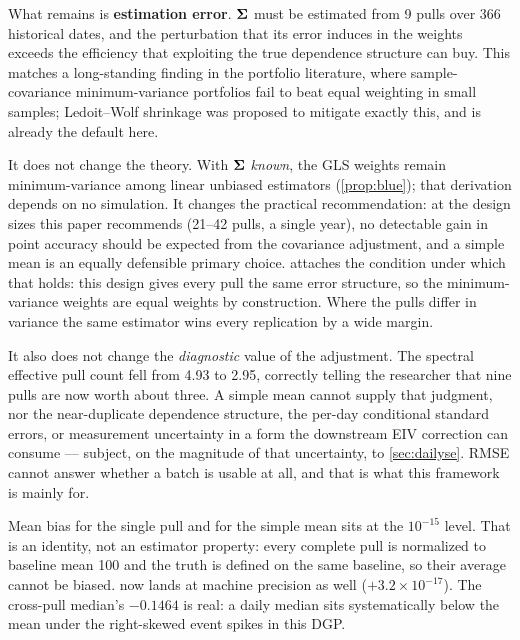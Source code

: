 \documentclass[12pt,a4paper,oneside]{article}
\begin{document}
What remains is \textbf{estimation error}. $\bm{\Sigma}$ must be estimated from 9 pulls
over 366 historical dates, and the perturbation that its error induces in the
weights exceeds the efficiency that exploiting the true dependence structure can
buy. This matches a long-standing finding in the portfolio literature, where
sample-covariance minimum-variance portfolios fail to beat equal weighting in
small samples; Ledoit--Wolf shrinkage \citep{LedoitWolf2004} was proposed to
mitigate exactly this, and is already the default here.

\begin{remark}
It does not change the theory. With $\bm{\Sigma}$ \emph{known}, the GLS weights remain
minimum-variance among linear unbiased estimators (\cref{prop:blue}); that
derivation depends on no simulation. It changes the practical recommendation: at
the design sizes this paper recommends (21--42 pulls, a single year), no
detectable gain in point accuracy should be expected from the covariance
adjustment, and a simple mean is an equally defensible primary choice.
 attaches the condition under which that holds: this design
gives every pull the same error structure, so the minimum-variance weights are
equal weights by construction. Where the pulls differ in variance the same
estimator wins every replication by a wide margin.

It also does not change the \emph{diagnostic} value of the adjustment. The
spectral effective pull count fell from 4.93 to 2.95, correctly telling the
researcher that nine pulls are now worth about three. A simple mean cannot supply
that judgment, nor the near-duplicate dependence structure, the per-day
conditional standard errors, or measurement uncertainty in a form the downstream
EIV correction can consume --- subject, on the magnitude of that uncertainty, to
\cref{sec:dailyse}. RMSE cannot answer whether a batch is usable at all,
and that is what this framework is mainly for.
\end{remark}

\begin{remark}
Mean bias for the single pull and for the simple mean sits at the $10^{-15}$
level. That is an identity, not an estimator property: every complete pull is
normalized to baseline mean 100 and the truth is defined on the same baseline,
so their average cannot be biased. \RACER{} now lands at machine precision as
well ($+3.2\times10^{-17}$). The cross-pull median's $-0.1464$ is real: a daily
median sits systematically below the mean under the right-skewed event spikes in
this DGP.
\end{remark}
\end{document}
